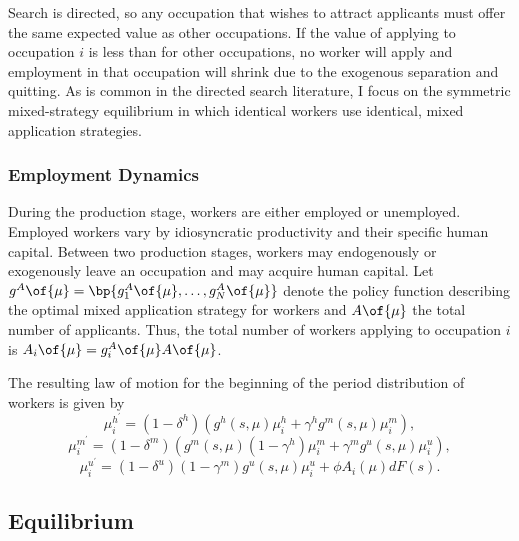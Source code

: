\documentclass[12pt]{article}
\theoremstyle{definition}
\begin{document}
Search is directed, so any occupation that wishes to attract applicants must offer the same expected value as other occupations. If the value of applying to occupation $i$ is less than for other occupations, no worker will apply and employment in that occupation will shrink due to the exogenous separation and quitting. As is common in the directed search literature, I focus on the symmetric mixed-strategy equilibrium in which identical workers use identical, mixed application strategies. 

\subsubsection{Employment Dynamics}

During the production stage, workers are either employed or unemployed. Employed workers vary by idiosyncratic productivity and their specific human capital. Between two production stages, workers may endogenously or exogenously leave an occupation and may acquire human capital. Let $g^A\of{\mu} = \bp{g_1^A\of{\mu}, \ldots, g_N^A\of{\mu}}$ denote the policy function describing the optimal mixed application strategy for workers and $A\of{\mu}$ the total number of applicants. Thus, the total number of workers applying to occupation $i$ is $A_i\of{\mu} = g_i^A\of{\mu} A\of{\mu}$.

The resulting law of motion for the beginning of the period distribution of workers is given by 
\begin{equation}
    \label{14}
    \mu_i^{h^{\prime}}=\left(1-\delta^h\right)\left(g^h(s, \mu) \mu_i^h+\gamma^h g^m(s, \mu) \mu_i^m\right),
\end{equation}
\begin{equation}
    \label{15}
    \mu_i^{m^{\prime}}=\left(1-\delta^m\right)\left(g^m(s, \mu)\left(1-\gamma^h\right) \mu_i^m+\gamma^m g^u(s, \mu) \mu_i^u\right),
\end{equation}
\begin{equation}
    \label{16}
    \mu_i^{u^{\prime}}=\left(1-\delta^u\right)\left(1-\gamma^m\right) g^u(s, \mu) \mu_i^u+\phi A_i(\mu) d F(s).
\end{equation}

\subsection{Equilibrium}
\end{document}

